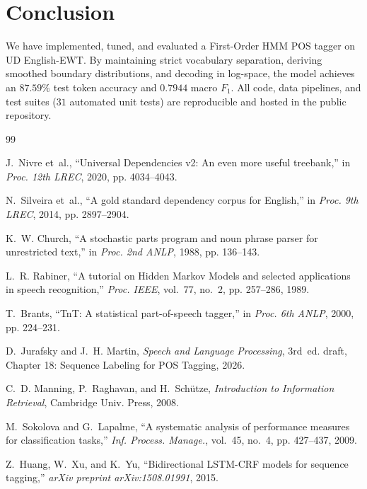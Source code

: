 \documentclass[conference]{IEEEtran}
\begin{document}
\section{Conclusion}
We have implemented, tuned, and evaluated a First-Order HMM POS tagger on UD English-EWT. By maintaining strict vocabulary separation, deriving smoothed boundary distributions, and decoding in log-space, the model achieves an $87.59\%$ test token accuracy and $0.7944$ macro $F_1$. All code, data pipelines, and test suites ($31$ automated unit tests) are reproducible and hosted in the public repository.


\begin{thebibliography}{99}

J.~Nivre et~al., ``Universal Dependencies v2: An even more useful treebank,'' in \emph{Proc. 12th LREC}, 2020, pp. 4034--4043.

N.~Silveira et~al., ``A gold standard dependency corpus for English,'' in \emph{Proc. 9th LREC}, 2014, pp. 2897--2904.

K.~W. Church, ``A stochastic parts program and noun phrase parser for unrestricted text,'' in \emph{Proc. 2nd ANLP}, 1988, pp. 136--143.

L.~R. Rabiner, ``A tutorial on Hidden Markov Models and selected applications in speech recognition,'' \emph{Proc. IEEE}, vol.~77, no.~2, pp. 257--286, 1989.

T.~Brants, ``TnT: A statistical part-of-speech tagger,'' in \emph{Proc. 6th ANLP}, 2000, pp. 224--231.

D.~Jurafsky and J.~H. Martin, \emph{Speech and Language Processing}, 3rd~ed. draft, Chapter 18: Sequence Labeling for POS Tagging, 2026.

C.~D. Manning, P.~Raghavan, and H.~Sch{\"u}tze, \emph{Introduction to Information Retrieval}, Cambridge Univ. Press, 2008.

M.~Sokolova and G.~Lapalme, ``A systematic analysis of performance measures for classification tasks,'' \emph{Inf. Process. Manage.}, vol.~45, no.~4, pp. 427--437, 2009.

Z.~Huang, W.~Xu, and K.~Yu, ``Bidirectional LSTM-CRF models for sequence tagging,'' \emph{arXiv preprint arXiv:1508.01991}, 2015.

\end{thebibliography}
\end{document}
